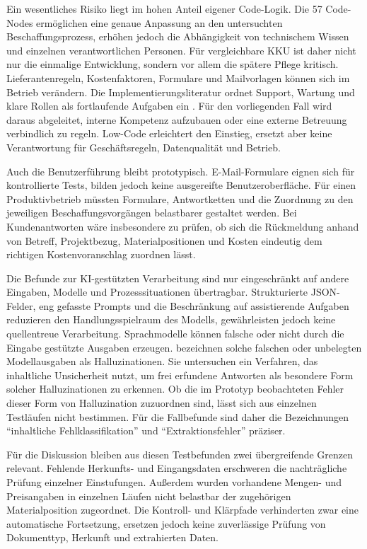 \documentclass[a4paper,12pt]{article}
\begin{document}
Ein wesentliches Risiko liegt im hohen Anteil eigener Code-Logik. Die 57 Code-Nodes ermöglichen eine genaue Anpassung an den untersuchten Beschaffungsprozess, erhöhen jedoch die Abhängigkeit von technischem Wissen und einzelnen verantwortlichen Personen. Für vergleichbare KKU ist daher nicht nur die einmalige Entwicklung, sondern vor allem die spätere Pflege kritisch. Lieferantenregeln, Kostenfaktoren, Formulare und Mailvorlagen können sich im Betrieb verändern. Die Implementierungsliteratur ordnet Support, Wartung und klare Rollen als fortlaufende Aufgaben ein \parencite{herm_framework_2023}. Für den vorliegenden Fall wird daraus abgeleitet, interne Kompetenz aufzubauen oder eine externe Betreuung verbindlich zu regeln. Low-Code erleichtert den Einstieg, ersetzt aber keine Verantwortung für Geschäftsregeln, Datenqualität und Betrieb.

Auch die Benutzerführung bleibt prototypisch. E-Mail-Formulare eignen sich für kontrollierte Tests, bilden jedoch keine ausgereifte Benutzeroberfläche. Für einen Produktivbetrieb müssten Formulare, Antwortketten und die Zuordnung zu den jeweiligen Beschaffungsvorgängen belastbarer gestaltet werden. Bei Kundenantworten wäre insbesondere zu prüfen, ob sich die Rückmeldung anhand von Betreff, Projektbezug, Materialpositionen und Kosten eindeutig dem richtigen Kostenvoranschlag zuordnen lässt.

Die Befunde zur KI-gestützten Verarbeitung sind nur eingeschränkt auf andere Eingaben, Modelle und Prozesssituationen übertragbar. Strukturierte JSON-Felder, eng gefasste Prompts und die Beschränkung auf assistierende Aufgaben reduzieren den Handlungsspielraum des Modells, gewährleisten jedoch keine quellentreue Verarbeitung. Sprachmodelle können falsche oder nicht durch die Eingabe gestützte Ausgaben erzeugen. \Textcite{farquhar_detecting_2024} bezeichnen solche falschen oder unbelegten Modellausgaben als Halluzinationen. Sie untersuchen ein Verfahren, das inhaltliche Unsicherheit nutzt, um frei erfundene Antworten als besondere Form solcher Halluzinationen zu erkennen. Ob die im Prototyp beobachteten Fehler dieser Form von Halluzination zuzuordnen sind, lässt sich aus einzelnen Testläufen nicht bestimmen. Für die Fallbefunde sind daher die Bezeichnungen \enquote{inhaltliche Fehlklassifikation} und \enquote{Extraktionsfehler} präziser.

Für die Diskussion bleiben aus diesen Testbefunden zwei übergreifende Grenzen relevant. Fehlende Herkunfts- und Eingangsdaten erschweren die nachträgliche Prüfung einzelner Einstufungen. Außerdem wurden vorhandene Mengen- und Preisangaben in einzelnen Läufen nicht belastbar der zugehörigen Materialposition zugeordnet. Die Kontroll- und Klärpfade verhinderten zwar eine automatische Fortsetzung, ersetzen jedoch keine zuverlässige Prüfung von Dokumenttyp, Herkunft und extrahierten Daten.
\end{document}
